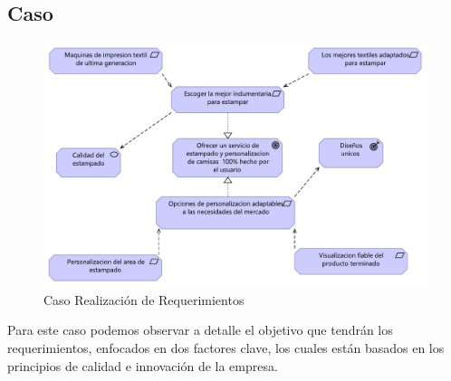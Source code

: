 \begin{center}
  \begin{minipage}{1\textwidth}
\subsection{Caso}
\begin{figure}[H]
	\centering	
    \includegraphics[width=1\linewidth]{imgs/Caso 5.pdf}
	\caption{Caso Realización de Requerimientos}	
 \end{figure}

Para este caso podemos observar a detalle el objetivo que tendrán los requerimientos, enfocados en dos factores clave, los cuales están basados en los principios de calidad e innovación de la empresa.

\end{minipage}
\end{center}





